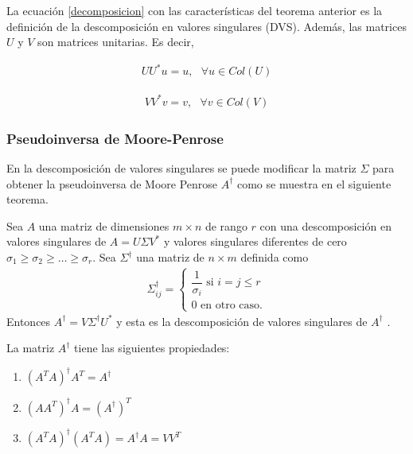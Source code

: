 La ecuación \ref{decomposicion} con las características del teorema anterior es la definición de la descomposición en valores singulares (DVS). Además, las matrices $U$ y $V$ son matrices unitarias. Es decir, 

\begin{equation*}
    \begin{aligned}
    U U^{*} u = u, \text{ } \forall u \in Col (U)
    \end{aligned}
\end{equation*}

\begin{equation*}
    \begin{aligned}
    V V^{*} v = v, \text{ } \forall v \in Col (V)
    \end{aligned}
\end{equation*}

\subsubsection{Pseudoinversa de Moore-Penrose}

En la descomposición de valores singulares se puede modificar la matriz $\Sigma$ para obtener la pseudoinversa de Moore Penrose $A^{\dagger}$ como se muestra en el siguiente teorema. 

\begin{theorem}
Sea $A$ una matriz de dimensiones $m \times n$ de rango $r$ con una descomposición en valores singulares de $A = U \Sigma V^{*}$ y valores singulares diferentes de cero $\sigma_1 \geq \sigma_2 \geq \dots \geq \sigma_r$. Sea $\Sigma^{\dagger}$ una matriz de $n \times m$ definida como
\begin{equation*}
    \begin{aligned}
   \Sigma^{\dagger}_{ij} =
   \begin{cases}
   \dfrac{1}{\sigma_i} \text{ si } i = j \leq r\\
   0 \text{ en otro caso.}
   \end{cases}
    \end{aligned}
\end{equation*}
Entonces $A^{\dagger} = V \Sigma^{\dagger} U ^{*}$ y esta es la descomposición de valores singulares de $A^{\dagger}$
\cite[p.~414]{friedberglinearalgebra}.
\end{theorem}


La matriz $A^{\dagger}$ tiene las siguientes propiedades:

\begin{enumerate}
    \item $(A^{T}A)^{\dagger} A^{T} = A^{\dagger}$
    \item $(AA^{T})^{\dagger} A = (A^{\dagger})^{T}$
    \item $(A^{T}A)^{\dagger}(A^{T}A) = A^{\dagger}A = VV^{T}$
\end{enumerate}

